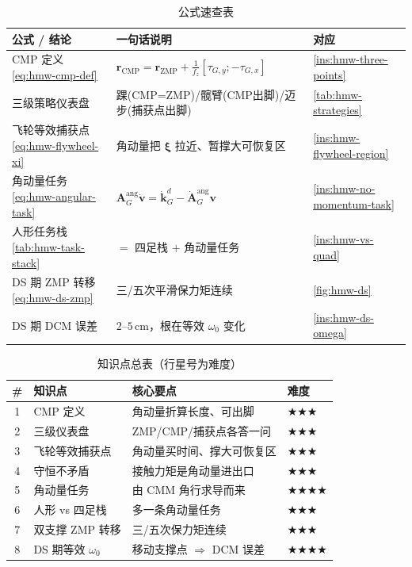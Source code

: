 \begin{table}[H]\centering\small
\caption{公式速查表}
\begin{tabular}{lll}
\toprule
公式 / 结论 & 一句话说明 & 对应 \\
\midrule
CMP 定义 \cref{eq:hmw-cmp-def} & $\mathbf r_{\mathrm{CMP}}=\mathbf r_{\mathrm{ZMP}}+\frac{1}{f_z}[\tau_{G,y};-\tau_{G,x}]$ & \cref{ins:hmw-three-points} \\
三级策略仪表盘 & 踝(CMP=ZMP)/髋臂(CMP出脚)/迈步(捕获点出脚) & \cref{tab:hmw-strategies} \\
飞轮等效捕获点 \cref{eq:hmw-flywheel-xi} & 角动量把 $\boldsymbol\xi$ 拉近、暂撑大可恢复区 & \cref{ins:hmw-flywheel-region} \\
角动量任务 \cref{eq:hmw-angular-task} & $\mathbf A_G^{\mathrm{ang}}\dot{\mathbf v}=\dot{\mathbf k}_G^d-\dot{\mathbf A}_G^{\mathrm{ang}}\mathbf v$ & \cref{ins:hmw-no-momentum-task} \\
人形任务栈 \cref{tab:hmw-task-stack} & $=$ 四足栈 $+$ 角动量任务 & \cref{ins:hmw-vs-quad} \\
DS 期 ZMP 转移 \cref{eq:hmw-ds-zmp} & 三/五次平滑保力矩连续 & \cref{fig:hmw-ds} \\
DS 期 DCM 误差 & $2$–$5\,\mathrm{cm}$，根在等效 $\omega_0$ 变化 & \cref{ins:hmw-ds-omega} \\
\bottomrule
\end{tabular}
\end{table}

\begin{table}[H]\centering\small
\caption{知识点总表（行星号为难度）}
\begin{tabular}{clll}
\toprule
\# & 知识点 & 核心要点 & 难度 \\
\midrule
1 & CMP 定义 & 角动量折算长度、可出脚 & \(\bigstar\bigstar\bigstar\) \\
2 & 三级仪表盘 & ZMP/CMP/捕获点各答一问 & \(\bigstar\bigstar\bigstar\) \\
3 & 飞轮等效捕获点 & 角动量买时间、撑大可恢复区 & \(\bigstar\bigstar\bigstar\) \\
4 & 守恒不矛盾 & 接触力矩是角动量进出口 & \(\bigstar\bigstar\bigstar\) \\
5 & 角动量任务 & 由 CMM 角行求导而来 & \(\bigstar\bigstar\bigstar\bigstar\) \\
6 & 人形 vs 四足栈 & 多一条角动量任务 & \(\bigstar\bigstar\bigstar\) \\
7 & 双支撑 ZMP 转移 & 三/五次保力矩连续 & \(\bigstar\bigstar\bigstar\) \\
8 & DS 期等效 $\omega_0$ & 移动支撑点 $\Rightarrow$ DCM 误差 & \(\bigstar\bigstar\bigstar\bigstar\) \\
\bottomrule
\end{tabular}
\end{table}

